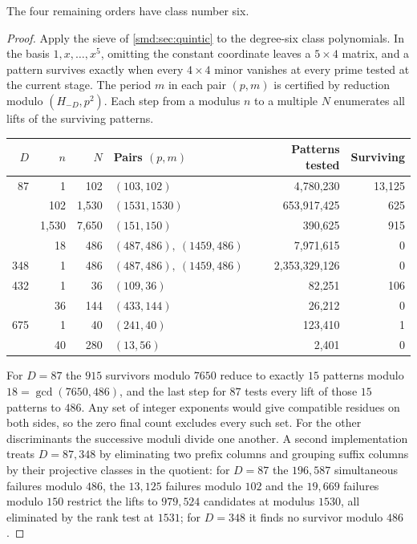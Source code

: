 
The four remaining orders have class number six.


\begin{proof}
Apply the sieve of \cref{smd:sec:quintic} to the degree-six class polynomials. In the
basis $1,x,\dots,x^5$, omitting the constant coordinate leaves a $5\times4$ matrix, and a
pattern survives exactly when every $4\times4$ minor vanishes at every prime tested at
the current stage. The period $m$ in each pair $(p,m)$ is certified by reduction modulo
$(H_{-D},p^2)$. Each step from a modulus $n$ to a multiple $N$ enumerates all lifts of the
surviving patterns.
\begin{center}
\begin{tabular}{rrrlrr}
\toprule
$D$ & $n$ & $N$ & Pairs $(p,m)$ & Patterns tested & Surviving\\
\midrule
87 & 1 & 102 & $(103,102)$ &4,780,230&13,125\\
 &102 &1,530 & $(1531,1530)$ &653,917,425&625\\
 &1,530&7,650& $(151,150)$ &390,625&915\\
 &18&486& $(487,486),\ (1459,486)$ &7,971,615&0\\
348&1&486& $(487,486),\ (1459,486)$ &2,353,329,126&0\\
432&1&36& $(109,36)$ &82,251&106\\
 &36&144& $(433,144)$ &26,212&0\\
675&1&40& $(241,40)$ &123,410&1\\
 &40&280& $(13,56)$ &2,401&0\\
\bottomrule
\end{tabular}
\end{center}
For $D=87$ the $915$ survivors modulo $7650$ reduce to exactly $15$ patterns modulo
$18=\gcd(7650,486)$, and the last step for $87$ tests every lift of those $15$ patterns to
$486$. Any set of integer exponents would give compatible residues on both sides, so the
zero final count excludes every such set. For the other discriminants the successive
moduli divide one another. A second implementation treats $D=87,348$ by eliminating two
prefix columns and grouping suffix columns by their projective classes in the quotient:
for $D=87$ the $196{,}587$ simultaneous failures modulo $486$, the $13{,}125$ failures
modulo $102$ and the $19{,}669$ failures modulo $150$ restrict the lifts to $979{,}524$
candidates at modulus $1530$, all eliminated by the rank test at $1531$; for $D=348$ it
finds no survivor modulo $486$.
\end{proof}

